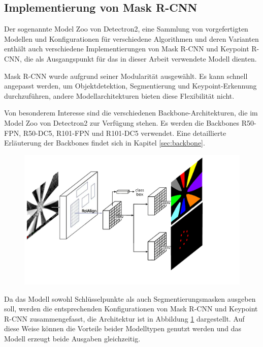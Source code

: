 \subsection{Implementierung von Mask R-CNN}
Der sogenannte \glqq Model Zoo\grqq{} von Detectron2, eine Sammlung von vorgefertigten Modellen und Konfigurationen für verschiedene Algorithmen und deren Varianten enthält auch verschiedene Implementierungen von Mask R-CNN und Keypoint R-CNN, die als Ausgangspunkt für das in dieser Arbeit verwendete Modell dienten.

Mask R-CNN wurde aufgrund seiner Modularität ausgewählt. Es kann schnell angepasst werden, um Objektdetektion, Segmentierung und Keypoint-Erkennung durchzuführen, andere Modellarchitekturen bieten diese Flexibilität nicht.

Von besonderem Interesse sind die verschiedenen Backbone-Architekturen, die im Model Zoo von Detectron2 zur Verfügung stehen. Es werden die Backbones R50-FPN, R50-DC5, R101-FPN und R101-DC5 verwendet.
Eine detaillierte Erläuterung der Backbones findet sich in Kapitel \ref{sec:backbone}.


\begin{figure}[h]
    \centering
    \includegraphics[width=0.8\linewidth, clip, trim={0 4cm 10cm 0.5cm}]{img/model_arch.png}
    \label{fig:modelarch}
\end{figure}
Da das Modell sowohl Schlüsselpunkte als auch Segmentierungsmasken ausgeben soll, werden die entsprechenden Konfigurationen von Mask R-CNN und Keypoint R-CNN zusammengefasst, die Architektur ist in Abbildung \ref{fig:modelarch} dargestellt. Auf diese Weise können die Vorteile beider Modelltypen genutzt werden und das Modell erzeugt beide Ausgaben gleichzeitig.

